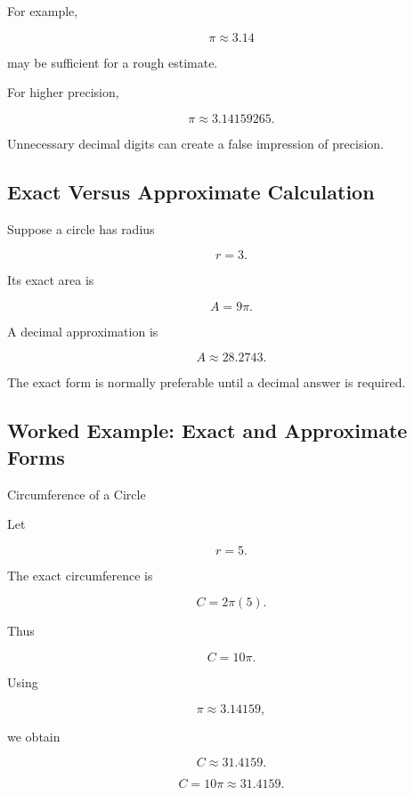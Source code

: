 For example,

\[
\boxed{
\pi
\approx
3.14
}
\]

may be sufficient for a rough estimate.

For higher precision,

\[
\boxed{
\pi
\approx
3.14159265.
}
\]

Unnecessary decimal digits can create a false impression of precision.

\subsection{Exact Versus Approximate Calculation}
\label{subsec:exact-approximate-calculation}

Suppose a circle has radius

\[
r=3.
\]

Its exact area is

\[
\boxed{
A=9\pi.
}
\]

A decimal approximation is

\[
\boxed{
A
\approx
28.2743.
}
\]

The exact form is normally preferable until a decimal answer is required.

\subsection{Worked Example: Exact and Approximate Forms}
\label{subsec:worked-exact-approximate-constant}

\begin{workedexamplebox}{Circumference of a Circle}

Let

\[
r=5.
\]

The exact circumference is

\[
C=2\pi(5).
\]

Thus

\[
C=10\pi.
\]

Using

\[
\pi\approx3.14159,
\]

we obtain

\[
C\approx31.4159.
\]

\begin{answerbox}
\[
\boxed{
C=10\pi
\approx31.4159.
}
\]
\end{answerbox}

\end{workedexamplebox}

